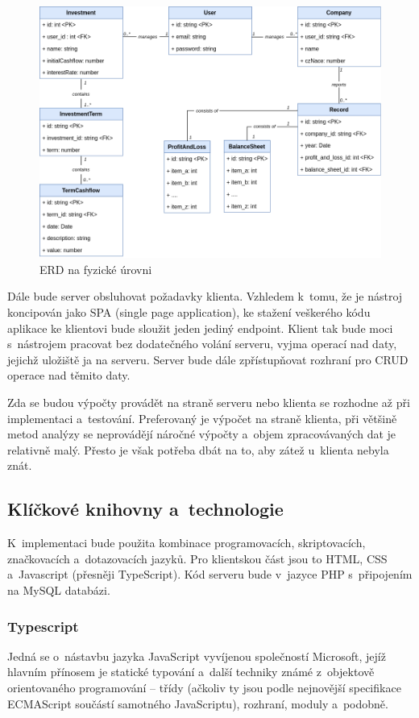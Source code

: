 \begin{figure}
  \centering
  \includegraphics[width=14cm]{img/erd.png}
  \caption{ERD na fyzické úrovni}
\end{figure}

Dále bude server obsluhovat požadavky klienta. Vzhledem k~tomu, že je nástroj koncipován jako SPA (single page application), ke stažení veškerého kódu aplikace ke klientovi bude sloužit jeden jediný endpoint. Klient tak bude moci s~nástrojem pracovat bez dodatečného volání serveru, vyjma operací nad daty, jejichž uložiště ja na serveru. Server bude dále zpřístupňovat rozhraní pro CRUD operace nad těmito daty.

Zda se budou výpočty provádět na straně serveru nebo klienta se rozhodne až při implementaci a~testování. Preferovaný je výpočet na straně klienta, při většině metod analýzy se neprovádějí náročné výpočty a~objem zpracovávaných dat je relativně malý. Přesto je však potřeba dbát na to, aby zátež u~klienta nebyla znát. 



\subsection{Klíčkové knihovny a~technologie}
K~implementaci bude použita kombinace programovacích, skriptovacích, značkovacích a~dotazovacích jazyků. Pro klientskou část jsou to HTML, CSS a~Javascript (přesněji TypeScript). Kód serveru bude v~jazyce PHP s~připojením na MySQL databázi.


\subsubsection{Typescript}
Jedná se o~nástavbu jazyka JavaScript vyvíjenou společností Microsoft, jejíž hlavním přínosem je statické typování a~další techniky známé z~objektově orientovaného programování -- třídy (ačkoliv ty jsou podle nejnovější specifikace ECMAScript součástí samotného JavaScriptu), rozhraní, moduly a~podobně.

